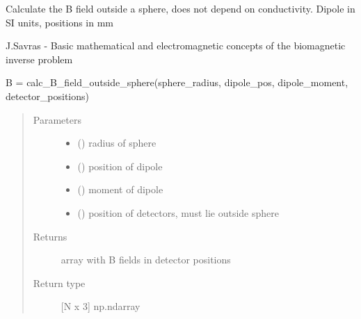 \documentclass[letterpaper,10pt,english,openany,oneside]{sphinxmanual}
\begin{document}
\begin{fulllineitems}
\label{\detokenize{pygpc:pygpc.testfun.calc_B_field_outside_sphere}}
Calculate the B field outside a sphere, does not depend on conductivity.
Dipole in SI units, positions in mm

J.Savras - Basic mathematical and electromagnetic concepts of the biomagnetic inverse problem

B = calc\_B\_field\_outside\_sphere(sphere\_radius, dipole\_pos, dipole\_moment, detector\_positions)
\begin{quote}\begin{description}
\item[{Parameters}] \leavevmode\begin{itemize}
\item {} 
 () \textendash{} radius of sphere

\item {} 
 (\sphinxstyleliteralemphasis{\sphinxupquote{{[}}}\sphinxstyleliteralemphasis{\sphinxupquote{{]} }}) \textendash{} position of dipole

\item {} 
 (\sphinxstyleliteralemphasis{\sphinxupquote{{[}}}\sphinxstyleliteralemphasis{\sphinxupquote{{]} }}) \textendash{} moment of dipole

\item {} 
 (\sphinxstyleliteralemphasis{\sphinxupquote{{[}}}\sphinxstyleliteralemphasis{\sphinxupquote{{]} }}) \textendash{} position of detectors, must lie outside sphere

\end{itemize}

\item[{Returns}] \leavevmode
{} \textendash{} array with B fields in detector positions

\item[{Return type}] \leavevmode
{[}N x 3{]} np.ndarray

\end{description}\end{quote}

\end{fulllineitems}
\end{document}
